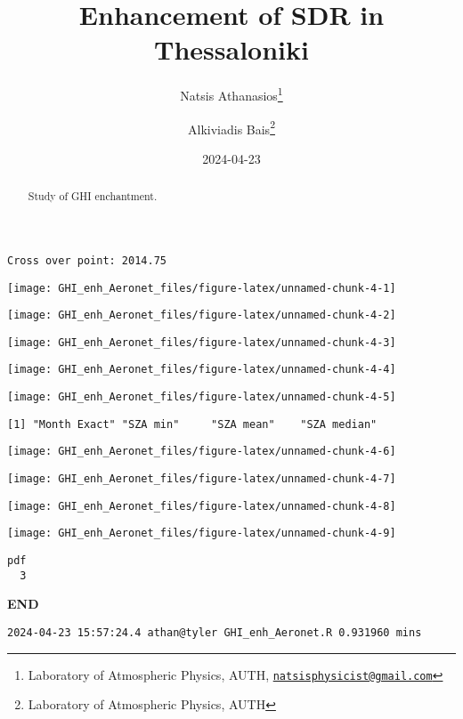 \documentclass[
  10pt,
  a4paper,oneside]{article}
\title{Enhancement of SDR in Thessaloniki}
\author{Natsis Athanasios\footnote{Laboratory of Atmospheric Physics, AUTH, \href{mailto:natsisphysicist@gmail.com}{\nolinkurl{natsisphysicist@gmail.com}}} \and Alkiviadis Bais\footnote{Laboratory of Atmospheric Physics, AUTH}}
\date{2024-04-23}
\begin{document}
\maketitle
\begin{abstract}
Study of GHI enchantment.
\end{abstract}

{
\hypersetup{linkcolor=}
\setcounter{tocdepth}{4}
\tableofcontents
}
\begin{verbatim}
Cross over point: 2014.75 
\end{verbatim}

\begin{center}\texttt{[image: GHI\_enh\_Aeronet\_files/figure-latex/unnamed-chunk-4-1]} \end{center}

\begin{center}\texttt{[image: GHI\_enh\_Aeronet\_files/figure-latex/unnamed-chunk-4-2]} \end{center}

\begin{center}\texttt{[image: GHI\_enh\_Aeronet\_files/figure-latex/unnamed-chunk-4-3]} \end{center}

\begin{center}\texttt{[image: GHI\_enh\_Aeronet\_files/figure-latex/unnamed-chunk-4-4]} \end{center}

\begin{center}\texttt{[image: GHI\_enh\_Aeronet\_files/figure-latex/unnamed-chunk-4-5]} \end{center}

\begin{verbatim}
[1] "Month Exact" "SZA min"     "SZA mean"    "SZA median" 
\end{verbatim}

\begin{center}\texttt{[image: GHI\_enh\_Aeronet\_files/figure-latex/unnamed-chunk-4-6]} \end{center}

\begin{center}\texttt{[image: GHI\_enh\_Aeronet\_files/figure-latex/unnamed-chunk-4-7]} \end{center}

\begin{center}\texttt{[image: GHI\_enh\_Aeronet\_files/figure-latex/unnamed-chunk-4-8]} \end{center}

\begin{center}\texttt{[image: GHI\_enh\_Aeronet\_files/figure-latex/unnamed-chunk-4-9]} \end{center}

\begin{verbatim}
pdf 
  3 
\end{verbatim}

\textbf{END}

\begin{verbatim}
2024-04-23 15:57:24.4 athan@tyler GHI_enh_Aeronet.R 0.931960 mins
\end{verbatim}
\end{document}
